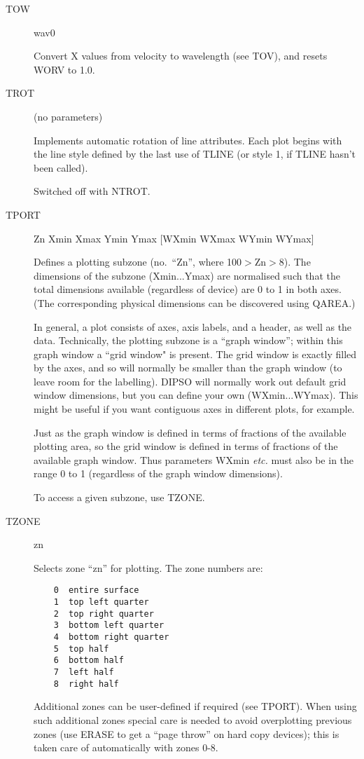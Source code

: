 \begin {description}
\item [TOW] wav0

Convert X values from velocity to wavelength (see TOV), and resets
WORV to 1.0.

\item [TROT] (no parameters)

Implements automatic rotation of line attributes. Each plot begins
with the line style defined by the last use of TLINE (or style 1, if
TLINE hasn't been called).

Switched off with NTROT.

\item [TPORT] Zn Xmin Xmax Ymin Ymax [WXmin WXmax WYmin WYmax]

Defines a plotting subzone (no.\ ``Zn'', where 100$>$Zn$>$8). The
dimensions of the subzone (Xmin...Ymax) are normalised such that the
total dimensions available (regardless of device) are 0 to 1 in both
axes. (The corresponding physical dimensions can be discovered using
QAREA.)

In general, a plot consists of axes, axis labels, and a header, as
well as the data. Technically, the plotting subzone is a ``graph
window''; within this graph window a ``grid window" is present. The
grid window is exactly filled by the axes, and so will normally be
smaller than the graph window (to leave room for the labelling). DIPSO
will normally work out default grid window dimensions, but you can
define your own (WXmin...WYmax). This might be useful if you want
contiguous axes in different plots, for example.

Just as the graph window is defined in terms of fractions of the
available plotting area, so the grid window is defined in terms of
fractions of the available graph window. Thus parameters WXmin {\em
etc.} must also be in the range 0 to 1 (regardless of the graph window
dimensions).

To access a given subzone, use TZONE.

\item [TZONE] zn

Selects zone ``zn'' for plotting. The zone numbers are:

\begin{verbatim}
    0  entire surface
    1  top left quarter
    2  top right quarter
    3  bottom left quarter
    4  bottom right quarter
    5  top half
    6  bottom half
    7  left half
    8  right half
\end{verbatim}

Additional zones can be user-defined if required (see TPORT). When
using such additional zones special care is needed to avoid
overplotting previous zones (use ERASE to get a ``page throw'' on hard
copy devices);  this is taken care of automatically with zones 0-8.


\end{description}
